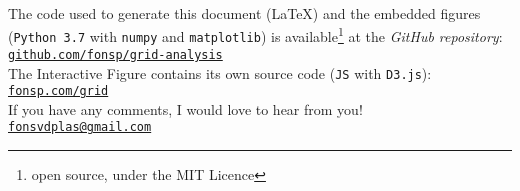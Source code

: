 \documentclass{report}
\theoremstyle{definition}
\theoremstyle{remark}
\begin{document}
%


\vspace{8em}
{The code used to generate this document (\LaTeX) and the embedded figures (\texttt{Python 3.7} with \texttt{numpy} and \texttt{matplotlib}) is available\footnote{open source, under the MIT Licence} at the \emph{GitHub repository}:}\\[1em]
\hphantom{asdfsdzz}\href{https://github.com/fonsp/grid-analysis}{\texttt{github.com/fonsp/grid-analysis}}\\[2em]

{The Interactive Figure contains its own source code (\texttt{JS} with \texttt{D3.js}):}\\[1em]
\hphantom{asdfsdzz}\href{https://fonsp.com/grid}{\texttt{fonsp.com/grid}}\\[2em]

{If you have any comments, I would love to hear from you!}\\[1em]
\hphantom{asdfsdzz}\href{mailto:fonsvdplas@gmail.com}{\texttt{fonsvdplas@gmail.com}}\\[2em]

\end{document}
